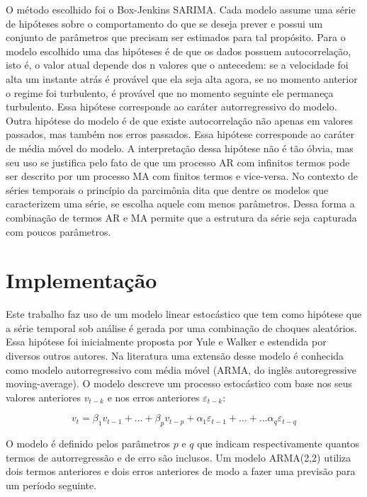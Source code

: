 \documentclass[
	12pt,				%
	openright,			%
	oneside,			%
	a4paper,			%
	english,			%
	french,				%
	spanish,			%
	brazil				%
	]{abntex2}
\begin{document}
O método escolhido foi o Box-Jenkins SARIMA.
Cada modelo assume uma série de hipóteses sobre o comportamento do que se deseja prever e possui um conjunto de parâmetros que precisam ser estimados para tal propósito. Para o modelo escolhido uma das hipóteses é de que os dados possuem autocorrelação, isto é, o valor atual depende dos n valores que o antecedem: se a velocidade foi alta um instante atrás é provável que ela seja alta agora, se no momento anterior o regime foi turbulento, é provável que no momento seguinte ele permaneça turbulento. Essa hipótese corresponde ao caráter autorregressivo do modelo. Outra hipótese do modelo é de que existe autocorrelação não apenas em valores passados, mas também nos erros passados. Essa hipótese corresponde ao caráter de média móvel do modelo. A interpretação dessa hipótese não é tão óbvia, mas seu uso se justifica pelo fato de que um processo AR com infinitos termos pode ser descrito por um processo MA com finitos termos e vice-versa. No contexto de séries temporais o princípio da parcimônia dita que dentre os modelos que  caracterizem uma série, se escolha aquele com menos parâmetros. Dessa forma a combinação de termos AR e MA permite que a estrutura da série seja capturada com poucos parâmetros.


\part{Implementação}

Este trabalho faz uso de um modelo linear estocástico que tem como hipótese que a série temporal sob análise é gerada por uma combinação de choques aleatórios. Essa hipótese foi inicialmente proposta por Yule e Walker \cite{yulewalker} e estendida por diversos outros autores.
Na literatura uma extensão desse modelo é conhecida como modelo autorregressivo com média móvel (ARMA, do inglês autoregressive moving-average).
O modelo descreve um processo estocástico com base nos seus valores anteriores $v_{t-k}$ e nos erros anteriores $\varepsilon_{t-k}$:

\begin{equation}
v_t = \beta_1 v_{t-1} + \dots + \beta_p v_{t-p} + \alpha_1\varepsilon_{t-1} + \dots + \dots \alpha_q\varepsilon_{t-q} 
\end{equation}

O modelo é definido pelos parâmetros $p$ e $q$ que indicam respectivamente quantos termos de autorregressão e de erro são inclusos. Um modelo ARMA(2,2) utiliza dois termos anteriores e dois erros anteriores de modo a fazer uma previsão para um período seguinte. 
\end{document}
